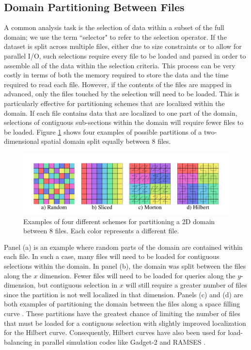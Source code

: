 \documentclass[apjl]{emulateapj}
\begin{document}
\subsection{Domain Partitioning Between Files}\label{SS:decomp}
A common analysis task is the selection of data within a subset of the full domain; we use the term ``selector" to refer to the selection operator. If the dataset is split across multiple files, either due to size constraints or to allow for parallel I/O, such selections require every file to be loaded and parsed in order to assemble all of the data within the selection criteria. This process can be very costly in terms of both the memory required to store the data and the time required to read each file. However, if the contents of the files are mapped in advanced, only the files touched by the selection will need to be loaded. This is particularly effective for partitioning schemes that are localized within the domain. If each file contains data that are localized to one part of the domain, selections of contiguous sub-sections within the domain will require fewer files to be loaded. Figure \ref{fig:files} shows four examples of possible partitions of a two-dimensional spatial domain split equally between 8 files. 
%
\begin{figure}[htbp]
\begin{center}
\includegraphics[width=\columnwidth,keepaspectratio]{../images/files.png}
\caption{Examples of four different schemes for partitioning a 2D domain between 8 files. Each color represents a different file.}
\label{fig:files}
\end{center}
\end{figure}
%

Panel (a) is an example where random parts of the domain are contained within each file. In such a case, many files will need to be loaded for contiguous selections within the domain. In panel (b), the domain was split between the files along the $x$ dimension. Fewer files will need to be loaded for queries along the $y$-dimension, but contiguous selection in $x$ will still require a greater number of files since the partition is not well localized in that dimension. Panels (c) and (d) are both examples of partitioning the domain between the files along a space filling curve \citep[Morton and Hilbert curves respectively;][]{Morton1996,Hilbert1970}. These partitions have the greatest chance of limiting the number of files that must be loaded for a contiguous selection with slightly improved localization for the Hilbert curve. Consequently, Hilbert curves have also been used for load-balancing in parallel simulation codes like {\sc Gadget-2} \citep{Springel2005b} and RAMSES \citep{Teyssier2001}.
\end{document}
